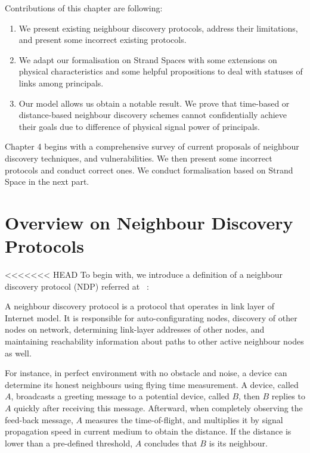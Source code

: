 Contributions of this chapter are following:
\begin{enumerate}
\item We present existing neighbour discovery protocols, address their limitations, and present some incorrect existing protocols.  
\item We adapt our formalisation on Strand Spaces with some extensions on physical characteristics and some helpful propositions to deal with statuses of links among principals. 
\item Our model allows us obtain a notable result. We prove that time-based or distance-based neighbour discovery schemes cannot confidentially achieve their goals due to difference of physical signal power of principals. 
\end{enumerate}

Chapter 4 begins with a comprehensive survey of current proposals of neighbour discovery techniques, and vulnerabilities. We then present some incorrect protocols and conduct correct ones. We conduct formalisation based on Strand Space in the next part.  
 
 \section{Overview on Neighbour Discovery Protocols}

<<<<<<< HEAD
To begin with, we introduce a definition of a neighbour discovery protocol (NDP) referred at ~\cite{ndp}:
\begin{Definition}
A neighbour discovery protocol is a protocol that operates in link layer of Internet model. It is responsible for auto-configurating nodes, discovery of other nodes on network, determining link-layer addresses of other nodes, and maintaining reachability information about paths to other active neighbour nodes as well. 
\end{Definition}

For instance, in perfect environment with no obstacle and noise, a device can determine its honest neighbours using flying time measurement. A device, called $A$, broadcasts a greeting message to a potential device, called $B$, then $B$ replies to $A$ quickly after receiving this message. Afterward, when completely observing the feed-back message, $A$ measures the time-of-flight, and multiplies it by signal propagation speed in current medium to obtain the distance. If the distance is lower than a pre-defined threshold, $A$ concludes that $B$ is its neighbour.

